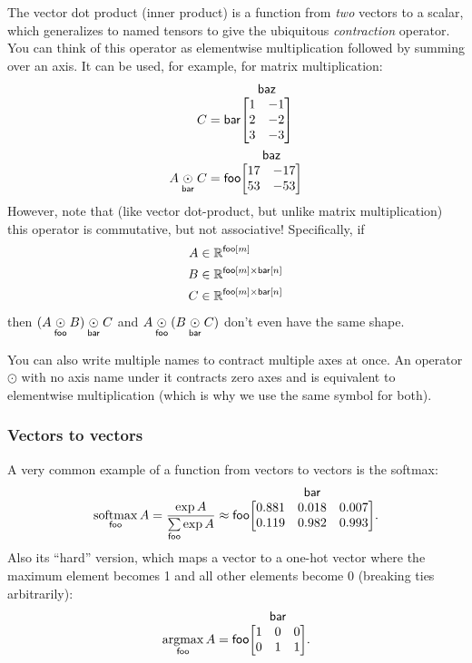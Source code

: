 \documentclass{article}
\makeatletter
\newcommand{\nmatrix}[3]{\name{#1}\begin{array}[b]{@{}c@{}}\name{#2}\\\begin{bmatrix}#3\end{bmatrix}\end{array}}
\makeatother
\begin{document}
The vector dot product (inner product) is a function from \emph{two} vectors to a scalar, which generalizes to named tensors to give the ubiquitous \emph{contraction} operator. You can think of this operator as elementwise multiplication followed by summing over an axis. It can be used, for example, for matrix multiplication:
\begin{align*}
C &= \nmatrix{bar}{baz}{
  1 & -1 \\ 2 & -2 \\ 3 & -3
} \\
A \ndot{bar} C &= \nmatrix{foo}{baz}{
  17 & -17 \\
  53 & -53
}
\end{align*}
However, note that (like vector dot-product, but unlike matrix multiplication) this operator is commutative, but not associative! Specifically, if
\begin{align*}
A &\in \mathbb{R}^{\mathsf{foo}[m]} \\
B &\in \mathbb{R}^{\mathsf{foo}[m] \times\mathsf{bar}[n]} \\
C &\in \mathbb{R}^{\mathsf{foo}[m] \times\mathsf{bar}[n]}
\end{align*}
then $(A \mathbin{\underset{\mathsf{foo}}{\odot}} B) \mathbin{\underset{\mathsf{bar}}{\odot}} C$ and $A \mathbin{\underset{\mathsf{foo}}{\odot}} (B \mathbin{\underset{\mathsf{bar}}{\odot}} C)$ don't even have the same shape.

You can also write multiple names to contract multiple axes at once. An operator $\odot$ with no axis name under it contracts zero axes and is equivalent to elementwise multiplication (which is why we use the same symbol for both).

\subsubsection{Vectors to vectors}

A very common example of a function from vectors to vectors is the softmax:
\begin{equation*}
  \nfun{foo}{softmax} A = \frac{\exp A}{\nsum{foo} \exp A} \approx \nmatrix{foo}{bar}{
    0.881 & 0.018 & 0.007 \\
    0.119 & 0.982 & 0.993
  }.
\end{equation*}
Also its ``hard'' version, which maps a vector to a one-hot vector where the maximum element becomes 1 and all other elements become 0 (breaking ties arbitrarily):
\begin{equation*}
  \nfun{foo}{argmax} A = \nmatrix{foo}{bar}{
    1 & 0 & 0 \\
    0 & 1 & 1
  }.
\end{equation*}
\end{document}
